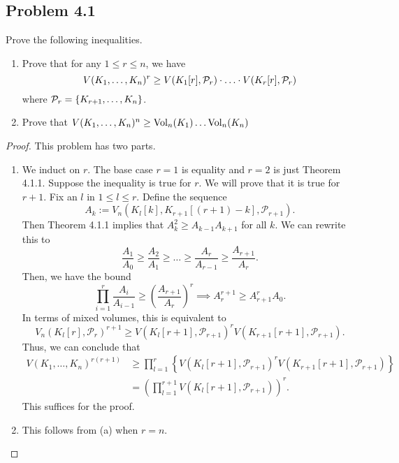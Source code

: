 \documentclass[12pt]{article}
\begin{document}
\subsection{Problem 4.1}
\begin{problem}
	Prove the following inequalities. 
    \begin{enumerate}[label = (\alph*)]
        \item Prove that for any $1 \leq r \leq n$, we have 
        \[
            V(K_1, \ldots, K_n)^r \geq V(K_1[r], \mathcal{P}_r) \cdot \ldots \cdot V(K_r[r], \mathcal{P}_r)
        \]
        where $\mathcal{P}_r = \{K_{r+1}, \ldots, K_n\}$. 
        \item Prove that $V(K_1, \ldots, K_n)^n \geq \operatorname{Vol}_n(K_1) \ldots \operatorname{Vol}_n(K_n)$
    \end{enumerate}
\end{problem}

\begin{proof}
	This problem has two parts. 
	\begin{enumerate}[label = (\alph*)]
		\item We induct on $r$. The base case $r = 1$ is equality and $r = 2$ is just Theorem 4.1.1. Suppose the inequality is true for $r$. We will prove that it is true for $r+1$. Fix an $l$ in $1 \leq l \leq r$. Define the sequence 
		\[
			A_k := V_n(K_l[k], K_{r+1}[(r+1)-k], \mathcal{P}_{r+1}).
		\]
		Then Theorem 4.1.1 implies that $A_k^2 \geq A_{k-1}A_{k+1}$ for all $k$. We can rewrite this to 
		\[
			\frac{A_1}{A_0} \geq \frac{A_2}{A_1} \geq \ldots \geq \frac{A_r}{A_{r-1}} \geq \frac{A_{r+1}}{A_r}. 
		\]
		Then, we have the bound 
		\[
			\prod_{i = 1}^r \frac{A_i}{A_{i-1}} \geq \left ( \frac{A_{r+1}}{A_r} \right )^r \implies A_r^{r+1} \geq A_{r+1}^r A_0. 
		\]
		In terms of mixed volumes, this is equivalent to 
		\[
			V_n(K_l[r], \mathcal{P}_r)^{r+1} \geq V(K_l[r+1], \mathcal{P}_{r+1})^r V(K_{r+1}[r+1], \mathcal{P}_{r+1}). 
		\]
		Thus, we can conclude that 
		\begin{align*}
			V(K_1, \ldots, K_n)^{r(r+1)} & \geq \prod_{l = 1}^r \left \{ V(K_l[r+1], \mathcal{P}_{r+1})^r V(K_{r+1}[r+1], \mathcal{P}_{r+1}) \right \} \\
			& = \left ( \prod_{l = 1}^{r+1} V(K_l[r+1], \mathcal{P}_{r+1}) \right )^r.
		\end{align*}
		This suffices for the proof. 


		\item This follows from (a) when $r = n$. 
	\end{enumerate}
\end{proof}
\end{document}
